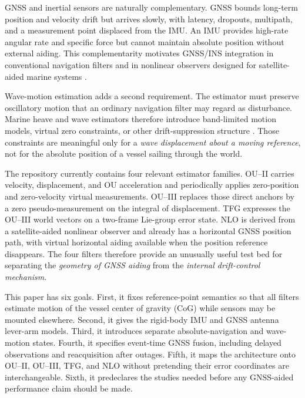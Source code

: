 \documentclass[conference]{IEEEtran}
\begin{document}
GNSS and inertial sensors are naturally complementary.  GNSS bounds long-term
position and velocity drift but arrives slowly, with latency, dropouts, multipath,
and a measurement point displaced from the IMU.  An IMU provides high-rate angular
rate and specific force but cannot maintain absolute position without external
aiding.  This complementarity motivates GNSS/INS integration in conventional
navigation filters and in nonlinear observers designed for satellite-aided marine
systems \cite{Kalman1960_Filtering,BryneFossenJohansen2014_TVG_NLO}.

Wave-motion estimation adds a second requirement.  The estimator must preserve
oscillatory motion that an ordinary navigation filter may regard as disturbance.
Marine heave and wave estimators therefore introduce band-limited motion models,
virtual zero constraints, or other drift-suppression structure
\cite{Auestad2013_HeaveStrapdownIMU,Pascoal2009_KalmanDirectionalSpectrum,
YurovskyKudinov2025_IMUwaves}.  Those constraints are meaningful only for a
\emph{wave displacement about a moving reference}, not for the absolute position of
a vessel sailing through the world.

The repository currently contains four relevant estimator families.  OU--II carries
velocity, displacement, and OU acceleration and periodically applies zero-position
and zero-velocity virtual measurements.  OU--III replaces those direct anchors by a
zero pseudo-measurement on the integral of displacement.  TFG expresses the OU--III
world vectors on a two-frame Lie-group error state.  NLO is derived from a
satellite-aided nonlinear observer and already has a horizontal GNSS position path,
with virtual horizontal aiding available when the position reference disappears.
The four filters therefore provide an unusually useful test bed for separating the
\emph{geometry of GNSS aiding} from the \emph{internal drift-control mechanism}.

This paper has six goals.  First, it fixes reference-point semantics so that all
filters estimate motion of the vessel center of gravity (CoG) while sensors may be
mounted elsewhere.  Second, it gives the rigid-body IMU and GNSS antenna lever-arm
models.  Third, it introduces separate absolute-navigation and wave-motion states.
Fourth, it specifies event-time GNSS fusion, including delayed observations and
reacquisition after outages.  Fifth, it maps the architecture onto OU--II, OU--III,
TFG, and NLO without pretending their error coordinates are interchangeable.  Sixth,
it predeclares the studies needed before any GNSS-aided performance claim should be
made.
\end{document}
